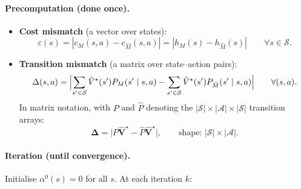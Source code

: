 \documentclass[11pt]{article}
\newcommand{\Vhatstar}{\hat V^\star}
\begin{document}
\paragraph{Precomputation (done once).}
\begin{itemize}
  \item \textbf{Cost mismatch} (a vector over states):
  \begin{equation}\label{eq:eps-q}
    \varepsilon(s) = |c_M(s,a) - c_{\hat M}(s,a)| = |h_M(s) - h_{\hat M}(s)|
    \qquad \forall  s \in \mathcal{S}.
  \end{equation}

  \item \textbf{Transition mismatch} (a matrix over state--action pairs):
  \begin{equation}\label{eq:delta-q}
    \Delta(s, a) = \Bigl|
      \sum_{s' \in \mathcal{S}} \Vhatstar(s')  P_M(s' \mid s, a)
      - \sum_{s' \in \mathcal{S}} \Vhatstar(s')  P_{\hat M}(s' \mid s, a)
    \Bigr|
    \qquad \forall  (s, a).
  \end{equation}
  In matrix notation, with $P$ and $\hat P$ denoting the $|\mathcal{S}| \times
  |\mathcal{A}| \times |\mathcal{S}|$ transition arrays:
  \[
    \boldsymbol{\Delta} = \bigl| P  \hat{\mathbf{V}}^\star
    - \hat P  \hat{\mathbf{V}}^\star \bigr|,
    \qquad \text{shape: } |\mathcal{S}| \times |\mathcal{A}|.
  \]
\end{itemize}

\paragraph{Iteration (until convergence).}
Initialise $\alpha^0(s) = 0$ for all $s$.  At each iteration $k$:
\end{document}
